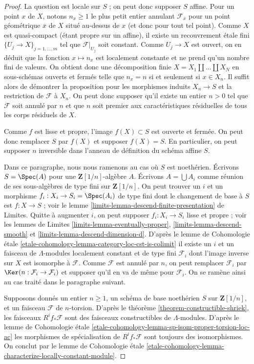 \begin{proof}
La question est locale sur $S$ ; on peut donc supposer $S$ affine.
Pour un point $x$ de $X$, notons $n_x \geq 1$
le plus petit entier annulant $\mathcal{F}_{\overline{x}}$
pour un point géométrique $\overline{x}$ de $X$
situé au-dessus de $x$ (et donc pour tout tel point). Comme $X$ est quasi-compact (étant propre sur un affine),
il existe un recouvrement étale fini $\{U_j \to X\}_{j = 1, \ldots, m}$
tel que $\mathcal{F}|_{U_j}$ soit constant. Comme $U_j \to X$
est ouvert, on en déduit que la fonction $x \mapsto n_x$ est localement
constante et ne prend qu'un nombre fini de valeurs. On obtient donc
une décomposition finie $X = X_1 \amalg \ldots \amalg X_N$
en sous-schémas ouverts et fermés telle que $n_x = n$ si et seulement si $x \in X_n$.
Il suffit alors de démontrer la proposition pour les morphismes induits
$X_n \to S$ et la restriction de $\mathcal{F}$ à $X_n$.
On peut donc supposer qu'il existe un entier $n > 0$ tel
que $\mathcal{F}$ soit annulé par $n$ et que $n$
soit premier aux caractéristiques résiduelles de tous les corps résiduels de $X$.

\medskip\noindent
Comme $f$ est lisse et propre, l'image $f(X) \subset S$ est ouverte et fermée.
On peut donc remplacer $S$ par $f(X)$ et supposer $f(X) = S$. En particulier,
on peut supposer $n$ inversible dans l'anneau de définition du
schéma affine $S$.

\medskip\noindent
Dans ce paragraphe, nous nous ramenons au cas où $S$ est noethérien.
Écrivons $S = \Spec(A)$ pour une $\mathbf{Z}[1/n]$-algèbre $A$.
Écrivons $A = \bigcup A_i$ comme réunion de ses sous-algèbres de type fini
sur $\mathbf{Z}[1/n]$. On peut trouver un $i$ et un morphisme
$f_i : X_i \to S_i = \Spec(A_i)$ de type
fini dont le changement de base à $S$ est $f : X \to S$ ; voir le
lemme \ref{limits-lemma-descend-finite-presentation} de Limites.
Quitte à augmenter $i$, on peut supposer $f_i : X_i \to S_i$
lisse et propre ; voir les lemmes de Limites
\ref{limits-lemma-eventually-proper},
\ref{limits-lemma-descend-smooth} et
\ref{limits-lemma-descend-dimension-d}.
D'après le lemme de Cohomologie étale
\ref{etale-cohomology-lemma-category-loc-cst-is-colimit}
il existe un $i$ et un faisceau
de $\Lambda$-modules localement constant et de type fini
$\mathcal{F}_i$ dont l'image inverse sur $X$ est isomorphe à $\mathcal{F}$.
Comme $\mathcal{F}$ est annulé par $n$, on peut remplacer
$\mathcal{F}_i$ par $\Ker(n : \mathcal{F}_i \to \mathcal{F}_i)$
et supposer qu'il en va de même pour $\mathcal{F}_i$.
On se ramène ainsi au cas traité dans le paragraphe suivant.

\medskip\noindent
Supposons donnés un entier $n \geq 1$, un schéma de base noethérien $S$
sur $\mathbf{Z}[1/n]$, et un faisceau $\mathcal{F}$ de $n$-torsion.
D'après le théorème \ref{theorem-constructible-shriek},
les faisceaux $R^if_*\mathcal{F}$ sont des faisceaux constructibles de $\Lambda$-modules.
D'après le lemme de Cohomologie étale
\ref{etale-cohomology-lemma-sp-isom-proper-torsion-loc-ac}
les morphismes de spécialisation de $R^if_*\mathcal{F}$ sont toujours des isomorphismes.
On conclut par le lemme de Cohomologie étale
\ref{etale-cohomology-lemma-characterize-locally-constant-module}.
\end{proof}
